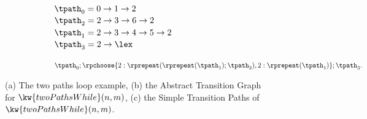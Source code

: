{\begin{figure}
\begin{subfigure}{.71\textwidth}
{\small
\begin{subfigure}{.3\textwidth}
\begin{centering}
    $\tpath_0 = 0 \to 1 \to 2$ \\
    $\tpath_2 = 2 \to 3 \to 6 \to 2$ \\ 
    $\tpath_1 = 2 \to 3 \to 4 \to 5 \to 2$ \\
    $\tpath_3 = 2 \to \lex$
    \caption{}
\end{centering}
\end{subfigure}
}
{\small
\begin{subfigure}{.8\textwidth}
\begin{centering}
$
\tpath_0 ; 
\rpchoose{2: \rprepeat(\rprepeat(\tpath_1); \tpath_2), 
2: \rprepeat(\tpath_1)}; \tpath_3.
$
\end{centering}
\end{subfigure}
}
\end{subfigure}
\caption{
(a) The two paths loop example,
(b) the Abstract Transition Graph for $\kw{twoPathsWhile}(n, m)$,
(c) the Simple Transition Paths of $\kw{twoPathsWhile}(n, m)$.}
    \label{fig:whileTwoCounters-overview}
\end{figure}
}


